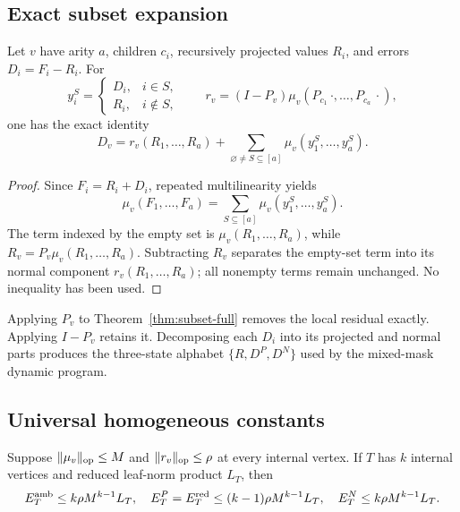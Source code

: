 \subsection{Exact subset expansion}

\begin{theorem}
\label{thm:subset-full}
Let \(v\) have arity \(a\), children \(c_i\), recursively projected values
\(R_i\), and errors \(D_i=F_i-R_i\). For
\[
 y_i^S=\begin{cases}D_i,&i\in S,\\R_i,&i\notin S,\end{cases}
 \qquad
 r_v=(I-P_v)\mu_v(P_{c_1}\,\cdot,\ldots,P_{c_a}\,\cdot),
\]
one has the exact identity
\[
 D_v=r_v(R_1,\ldots,R_a)
 +\sum_{\varnothing\ne S\subseteq[a]}
 \mu_v(y_1^S,\ldots,y_a^S).
\]
\end{theorem}

\begin{proof}
Since \(F_i=R_i+D_i\), repeated multilinearity yields
\[
 \mu_v(F_1,\ldots,F_a)
 =\sum_{S\subseteq[a]}\mu_v(y_1^S,\ldots,y_a^S).
\]
The term indexed by the empty set is \(\mu_v(R_1,\ldots,R_a)\), while
\(R_v=P_v\mu_v(R_1,\ldots,R_a)\). Subtracting \(R_v\) separates the
empty-set term into its normal component \(r_v(R_1,\ldots,R_a)\); all
nonempty terms remain unchanged. No inequality has been used.
\end{proof}

Applying \(P_v\) to Theorem~\ref{thm:subset-full} removes the local
residual exactly. Applying \(I-P_v\) retains it. Decomposing each \(D_i\)
into its projected and normal parts produces the three-state alphabet
\(\{R,D^P,D^N\}\) used by the mixed-mask dynamic program.

\subsection{Universal homogeneous constants}

\begin{theorem}
\label{thm:homogeneous-full}
Suppose \(\lVert\mu_v\rVert_{\rm op}\le M\) and
\(\lVert r_v\rVert_{\rm op}\le\rho\) at every internal vertex. If \(T\)
has \(k\) internal vertices and reduced leaf-norm product \(L_T\), then
\[
 E_T^{\rm amb}\le k\rho M^{k-1}L_T,
 \quad
 E_T^P=E_T^{\rm red}\le(k-1)\rho M^{k-1}L_T,
 \quad
 E_T^N\le k\rho M^{k-1}L_T.
\]
\end{theorem}

